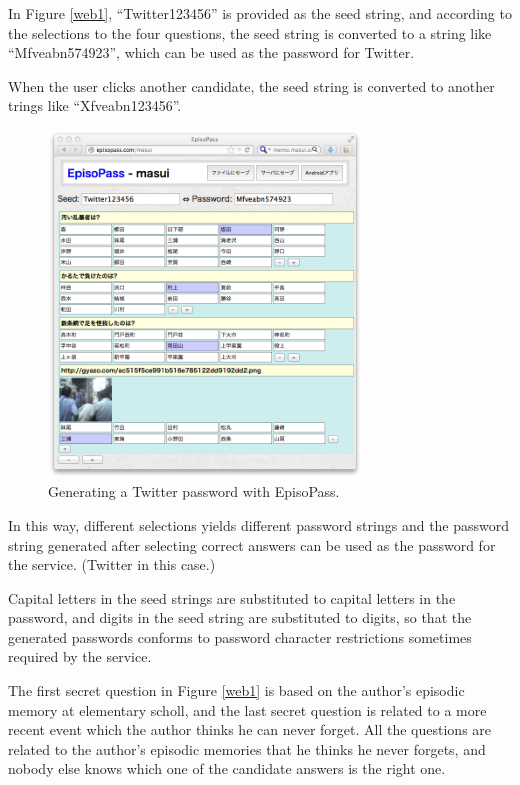 \documentclass{article}
\begin{document}
In Figure \ref{web1},
``\textsf{Twitter123456}'' is provided as the seed string,
and according to the selections to the four questions,
the seed string is converted to a string like
``\textsf{Mfveabn574923}'',
which can be used as the password for Twitter.

When the user clicks another candidate,
the seed string is converted to another trings like
``\textsf{Xfveabn123456}''.

\begin{figure}[H]
\centerline{\includegraphics[width=83mm,bb=0 0 718 796]{../WISS/figures/785ff09b4233804d2ec89c3af71ee5d0.png}}
\caption{Generating a Twitter password with EpisoPass.}
\label{web11}
\end{figure}

In this way, different selections yields different password strings and
the password string generated after selecting correct answers can be
used as the password for the service. (Twitter in this case.)

Capital letters in the seed strings are substituted to capital letters in the password,
and digits in the seed string are substituted to digits,
so that the generated passwords conforms to password character restrictions
sometimes required by the service.


The first secret question in Figure \ref{web1}
is based on the author's episodic memory at elementary scholl,
and the last secret question is related to a more recent event
which the author thinks he can never forget.
All the questions are related to the author's episodic memories
that he thinks he never forgets, and nobody else knows which one of the
candidate answers is the right one.
\end{document}
